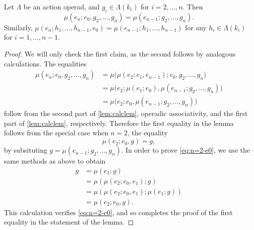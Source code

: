 \begin{lem}\label{lem:e0-unit}
Let $\Lambda$ be an action operad, and $g_i \in \Lambda(k_i)$ for $i=2, \ldots, n$. Then
\[
\mu(e_n; e_0, g_2, \ldots, g_n) = \mu(e_{n-1}; g_2, \ldots, g_n).
\]
Similarly, $\mu(e_n; h_1, \ldots, h_{n-1}, e_0) = \mu(e_{n-1}; h_1, \ldots, h_{n-1})$ for any $h_i \in \Lambda(k_i)$ for $i=1, \ldots, n-1$.
\end{lem}
\begin{proof}
We will only check the first claim, as the second follows by analogous calculations.
The equalities
\begin{align*}
\mu(e_n; e_0, g_2, \ldots, g_n) & = \mu \big( \mu(e_2; e_1, e_{n-1}); e_0, g_2, \ldots, g_n \big) \\
& = \mu\big( e_2; \mu(e_1; e_0), \mu(e_{n-1}; g_2, \ldots, g_n) \big) \\
& = \mu\big( e_2; e_0, \mu(e_{n-1}; g_2, \ldots, g_n) \big)
\end{align*}
follow from the second part of \cref{lem:calclem}, operadic associativity, and the first part of \cref{lem:calclem}, respectively.
Therefore the first equality in the lemma follows from the special case when $n=2$, the equality
\begin{equation}\label{eq:n=2-e0}
\mu(e_2; e_0, g) = g,
\end{equation}
by subsituting $g = \mu(e_{n-1}; g_2, \ldots, g_n)$.
In order to prove \cref{eq:n=2-e0}, we use the same methods as above to obtain
  \begin{align*}
   g & = \mu(e_1; g) \\
    &= \mu(\mu(e_2; e_0, e_1); g) \\
    & = \mu(\mu(e_2; e_0, e_1); \mu(e_1; g)) \\
    & = \mu(e_2; e_0, g).
  \end{align*}
This calculation verifies \cref{eq:n=2-e0}, and so completes the proof of the first equality in the statement of the lemma.
\end{proof}

